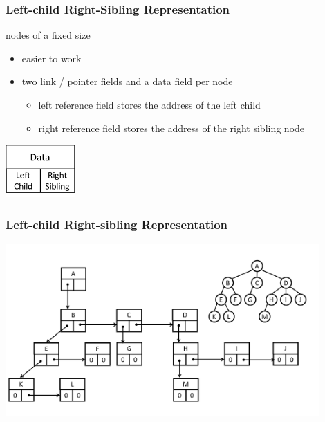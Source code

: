 \documentclass[newPxFont,sthlmFooter,nooffset]{beamer}
\begin{document}
\begin{frame}[t]
  \frametitle{Left-child Right-Sibling Representation}
nodes of a fixed size
\begin{itemize}
\item easier to work
\item two link / pointer fields and a data field per node
  \begin{itemize}
  \item left reference field stores the address of the left child
  \item right reference field stores the address of the right sibling node
  \end{itemize}
\end{itemize}
\begin{center}
  \includegraphics[width=0.2\textwidth]{figures/fig03_left-right.png}
\end{center}

\end{frame}



\begin{frame}[t]
  \frametitle{Left-child Right-sibling Representation}
  \begin{center}
    \includegraphics[width=0.9\textwidth]{figures/fig03_child-sibling.png}
  \end{center}

\end{frame}
\end{document}
